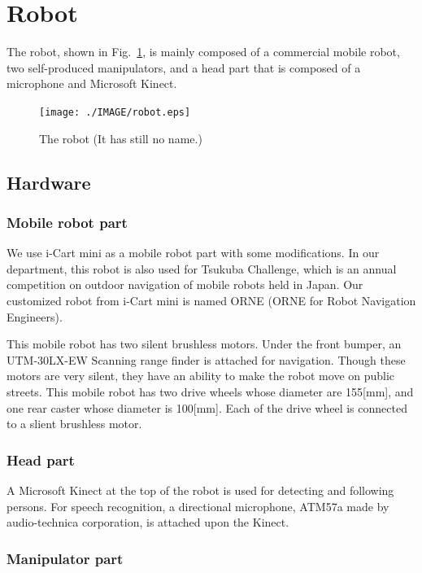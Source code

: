 \documentclass{llncs}
\begin{document}
\section{Robot}\label{sec:robot}
The robot, shown in Fig.~\ref{fig:robot},
is mainly composed of a commercial mobile robot,
two self-produced manipulators, and a head part that is composed of
a microphone and Microsoft Kinect.

\begin{figure}[h]
	\begin{center}
		\texttt{[image: ./IMAGE/robot.eps]}
		\caption{The robot (It has still no name.)}
		\label{fig:robot}
	\end{center}
\end{figure}

\subsection{Hardware}
\subsubsection{Mobile robot part}

We use i-Cart mini\cite{icartmini} as a mobile robot part
with some modifications. 
In our department, this robot is also used for Tsukuba Challenge,
which is an annual competition on outdoor navigation of mobile robots
held in Japan.
Our customized robot from i-Cart mini is named ORNE
(ORNE for Robot Navigation Engineers).

This mobile robot has two silent brushless motors.
Under the front bumper, an UTM-30LX-EW Scanning range finder
is attached for navigation.
Though these motors are very silent, 
they have an ability to make the robot move on public streets.
This mobile robot has two drive wheels whose diameter are 155[mm], 
and one rear caster whose diameter is 100[mm].
Each of the drive wheel is connected to a slient brushless motor.


\subsubsection{Head part}

A Microsoft Kinect at the top of the robot is used for
detecting and following persons.
For speech recognition, a directional microphone,
ATM57a made by audio-technica corporation, is attached
upon the Kinect.


\subsubsection{Manipulator part}
\end{document}
